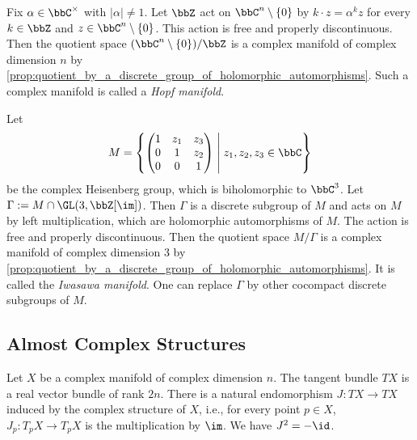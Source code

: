     \begin{example}\label{eg:hopf_manifolds_as_complex_manifolds_by_quotient_of_Cn}
        Fix \(\alpha \in \bbC^\times\) with \(|\alpha| \neq 1\).
        Let \(\bbZ\) act on \(\bbC^n\setminus \{0\}\) by \(k \cdot z = \alpha^k z\) for every \(k\in \bbZ\) and \(z\in \bbC^n\setminus \{0\}\).
        This action is free and properly discontinuous.
        Then the quotient space \((\bbC^n\setminus \{0\})/\bbZ\) is a complex manifold of complex dimension \(n\) by \cref{prop:quotient_by_a_discrete_group_of_holomorphic_automorphisms}.
        Such a complex manifold is called a \emph{Hopf manifold}.
    \end{example}

    \begin{example}\label{eg:Iwasawa_manifold_as_complex_manifold_by_quotient_of_complex_Heisenberg_group}
        Let 
        \[ M = \left\{ \begin{pmatrix}
            1 & z_1 & z_3 \\
            0 & 1 & z_2 \\
            0 & 0 & 1
        \end{pmatrix} \;\middle|\; z_1, z_2, z_3 \in \bbC \right\} \]
        be the complex Heisenberg group, which is biholomorphic to \(\bbC^3\).
        Let \(\Gamma := M \cap \GL(3,\bbZ[\im])\).
        Then \(\Gamma\) is a discrete subgroup of \(M\) and acts on \(M\) by left multiplication, which are holomorphic automorphisms of \(M\).
        The action is free and properly discontinuous.
        Then the quotient space \(M/\Gamma\) is a complex manifold of complex dimension \(3\) by \cref{prop:quotient_by_a_discrete_group_of_holomorphic_automorphisms}.
        It is called the \emph{Iwasawa manifold}.
        One can replace \(\Gamma\) by other cocompact discrete subgroups of \(M\).
    \end{example}

\subsection{Almost Complex Structures}

    Let \(X\) be a complex manifold of complex dimension \(n\).
    The tangent bundle \(TX\) is a real vector bundle of rank \(2n\).
    There is a natural endomorphism \(J: TX\to TX\) induced by the complex structure of \(X\), i.e., for every point \(p\in X\), \(J_p: T_pX\to T_pX\) is the multiplication by \(\im\).
    We have \(J^2 = -\id\).

